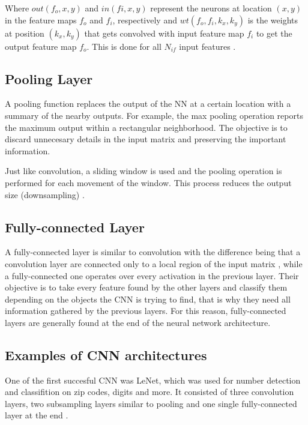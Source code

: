 Where $out(f_o,x,y)$ and $in(fi,x,y)$ represent the neurons at location
$(x,y)$ in the feature maps $f_o$ and $f_i$, respectively and 
$wt(f_o,f_i,k_x,k_y)$ is
the weights at position $(k_x,k_y)$ that gets convolved with input
feature map $f_i$ to get the output feature map $f_o$. This is done 
for all $N_{if}$ input features \cite{suda}.

\subsection{Pooling Layer}

A pooling function replaces the output of the NN at a certain 
location with a summary of the nearby outputs. For example, 
the max pooling \cite{zhou1988computation} operation reports the maximum 
output within a rectangular neighborhood. The objective is to discard
unnecesary details in the input matrix and preserving the important information.

Just like convolution, a sliding window is used and the pooling
operation is performed for each movement of the window. This process
reduces the output size (downsampling) \cite{karpathy2016cs231n}.

\subsection{Fully-connected Layer}

A fully-connected layer is similar to convolution with the difference being
that a convolution layer are connected only to a local region of the input matrix
, while a fully-connected one operates over every activation in the previous layer.
Their objective is to take every feature found by the other layers and classify
them depending on the objects the CNN is trying to find, that is why they need
all information gathered by the previous layers. For this reason, fully-connected
layers are generally found at the end of the neural network architecture.

\subsection{Examples of CNN architectures}

One of the first succesful CNN was LeNet, which was used for number detection
and classifition on zip codes, digits and more. It consisted of three convolution
layers, two subsampling layers similar to pooling and one single fully-connected
layer at the end \cite{lecun1998gradient}.


